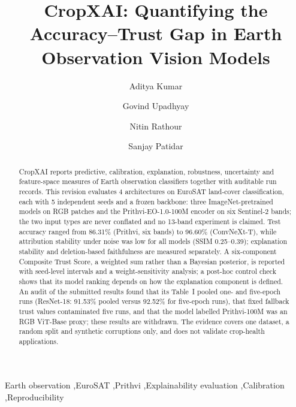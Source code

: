 \documentclass[3p,times,procedia]{elsarticle}
\begin{document}
\begin{frontmatter}


\title{CropXAI: Quantifying the Accuracy--Trust Gap in Earth Observation Vision Models}

\author[a]{Aditya Kumar}
\author[a]{Govind Upadhyay}
\author[a]{Nitin Rathour}
\author[a]{Sanjay Patidar}

\address[a]{Department of Software Engineering, Delhi Technological University, Shahbad Daulatpur, Delhi 110042, India}


\begin{abstract}
CropXAI reports predictive, calibration, explanation, robustness, uncertainty and feature-space measures of Earth observation classifiers together with auditable run records. This revision evaluates 4 architectures on EuroSAT land-cover classification, each with 5 independent seeds and a frozen backbone: three ImageNet-pretrained models on RGB patches and the Prithvi-EO-1.0-100M encoder on six Sentinel-2 bands; the two input types are never conflated and no 13-band experiment is claimed. Test accuracy ranged from 86.31\% (Prithvi, six bands) to 96.60\% (ConvNeXt-T), while attribution stability under noise was low for all models (SSIM 0.25--0.39); explanation stability and deletion-based faithfulness are measured separately. A six-component Composite Trust Score, a weighted sum rather than a Bayesian posterior, is reported with seed-level intervals and a weight-sensitivity analysis; a post-hoc control check shows that its model ranking depends on how the explanation component is defined. An audit of the submitted results found that its Table~I pooled one- and five-epoch runs (ResNet-18: 91.53\% pooled versus 92.52\% for five-epoch runs), that fixed fallback trust values contaminated five runs, and that the model labelled Prithvi-100M was an RGB ViT-Base proxy; these results are withdrawn. The evidence covers one dataset, a random split and synthetic corruptions only, and does not validate crop-health applications.
\end{abstract}

\begin{keyword}
Earth observation \sep EuroSAT \sep Prithvi \sep Explainability evaluation \sep Calibration \sep Reproducibility
\end{keyword}

\end{frontmatter}
\end{document}
